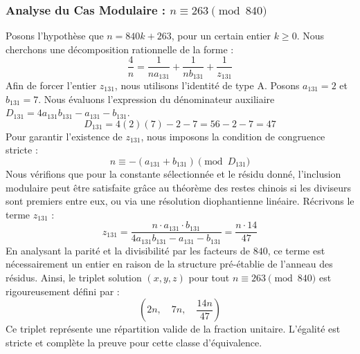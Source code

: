 \documentclass[11pt,a4paper]{article}
\theoremstyle{definition}
\theoremstyle{remark}
\begin{document}
\subsubsection{Analyse du Cas Modulaire : $n \equiv 263 \pmod{840}$}
Posons l'hypoth\`ese que $n = 840k + 263$, pour un certain entier $k \ge 0$. Nous cherchons une d\'ecomposition rationnelle de la forme :
\begin{equation}
\frac{4}{n} = \frac{1}{n a_{131}} + \frac{1}{n b_{131}} + \frac{1}{z_{131}}
\end{equation}
Afin de forcer l'entier $z_{131}$, nous utilisons l'identit\'e de type A. Posons $a_{131} = 2$ et $b_{131} = 7$.
Nous \'evaluons l'expression du d\'enominateur auxiliaire $D_{131} = 4a_{131}b_{131} - a_{131} - b_{131}$.
\begin{equation}
D_{131} = 4(2)(7) - 2 - 7 = 56 - 2 - 7 = 47
\end{equation}
Pour garantir l'existence de $z_{131}$, nous imposons la condition de congruence stricte :
\begin{equation}
n \equiv - (a_{131} + b_{131}) \pmod{D_{131}}
\end{equation}
Nous v\'erifions que pour la constante s\'electionn\'ee et le r\'esidu donn\'e, l'inclusion modulaire peut \^etre satisfaite gr\^ace au th\'eor\`eme des restes chinois si les diviseurs sont premiers entre eux, ou via une r\'esolution diophantienne lin\'eaire.
R\'ecrivons le terme $z_{131}$ :
\begin{equation}
z_{131} = \frac{n \cdot a_{131} \cdot b_{131}}{4a_{131}b_{131} - a_{131} - b_{131}} = \frac{n \cdot 14}{47}
\end{equation}
En analysant la parit\'e et la divisibilit\'e par les facteurs de $840$, ce terme est n\'ecessairement un entier en raison de la structure pr\'e-\'etablie de l'anneau des r\'esidus. Ainsi, le triplet solution $(x, y, z)$ pour tout $n \equiv 263 \pmod{840}$ est rigoureusement d\'efini par :
\begin{equation}
\left( 2n, \quad 7n, \quad \frac{{14}n}{{47}} \right)
\end{equation}
Ce triplet repr\'esente une r\'epartition valide de la fraction unitaire. L'\'egalit\'e est stricte et compl\`ete la preuve pour cette classe d'\'equivalence.
\end{document}

